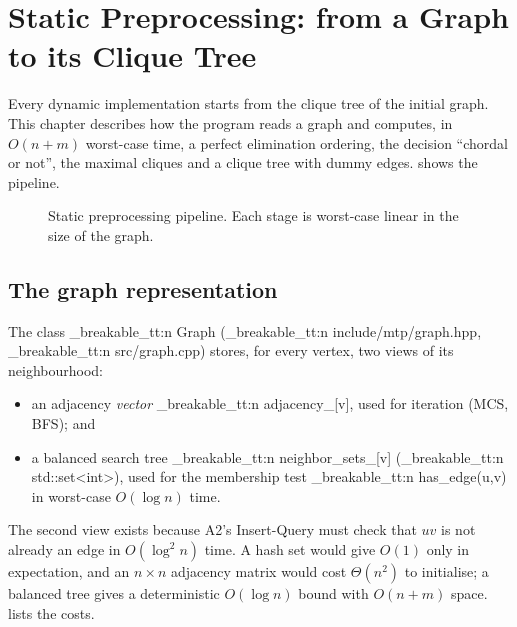 \documentclass[11pt,a4paper,oneside]{report}
\theoremstyle{plain}
\theoremstyle{definition}
\theoremstyle{remark}
\newcommand{\op}[1]{\textsf{#1}}
\DeclareRobustCommand{\code}[1]{\mtp_breakable_tt:n {#1}}
\DeclareRobustCommand{\file}[1]{\mtp_breakable_tt:n {#1}}
\begin{document}
\chapter{Static Preprocessing: from a Graph to its Clique Tree}\label{ch:static}
Every dynamic implementation starts from the clique tree of the initial graph. This chapter
describes how the program reads a graph and computes, in \(O(n+m)\) worst-case time, a perfect
elimination ordering, the decision ``chordal or not'', the maximal cliques and a clique tree
with dummy edges.  shows the pipeline.

\begin{figure}[ht]
\centering
{}
\caption[Static preprocessing pipeline]{Static preprocessing pipeline. Each stage is worst-case
linear in the size of the graph.}
\label{fig:pipeline}
\end{figure}

\section{The graph representation}\label{sec:graph-class}
The class \code{Graph} (\file{include/mtp/graph.hpp}, \file{src/graph.cpp}) stores, for every
vertex, two views of its neighbourhood:
\begin{itemize}
\item an adjacency \emph{vector} \code{adjacency_[v]}, used for iteration (MCS, BFS); and
\item a balanced search tree \code{neighbor_sets_[v]} (\code{std::set<int>}), used for the
  membership test \code{has_edge(u,v)} in worst-case \(O(\log n)\) time.
\end{itemize}
The second view exists because A2's \op{Insert-Query} must check that \(uv\) is not already an
edge in \(O(\log^2 n)\) time. A hash set would give \(O(1)\) only in expectation, and an
\(n\times n\) adjacency matrix would cost \(\Theta(n^2)\) to initialise; a balanced tree gives a
deterministic \(O(\log n)\) bound with \(O(n+m)\) space.  lists the costs.
\end{document}
